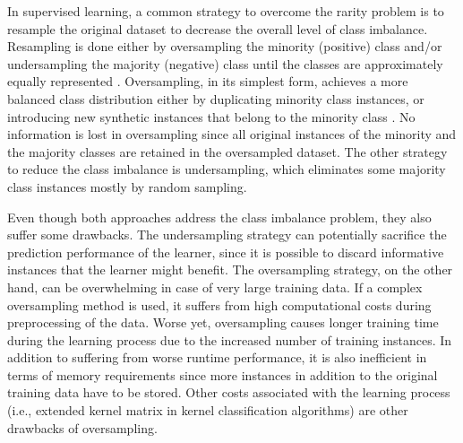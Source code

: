 In supervised learning, a common strategy to overcome the rarity problem is to resample the original dataset to decrease the overall level of class imbalance. Resampling is done either by oversampling the minority (positive) class and/or undersampling the majority (negative) class until the classes are approximately equally represented \cite{Chawla_2002,Japkowicz_2000,Kubat_1997,Ling_1998}. Oversampling, in its simplest form, achieves a more balanced class distribution either by duplicating minority class instances, or introducing new synthetic instances that belong to the minority class \cite{Chawla_2002}. No information is lost in oversampling since all original instances of the minority and the majority classes are retained in the oversampled dataset. The other strategy to reduce the class imbalance is undersampling, which eliminates some majority class instances mostly by random sampling.

Even though both approaches address the class imbalance problem, they also suffer some drawbacks. The undersampling strategy can potentially sacrifice the prediction performance of the learner, since it is possible to discard informative instances that the learner might benefit. The oversampling strategy, on the other hand, can be overwhelming in case of very large training data. If a complex oversampling method is used, it suffers from high computational costs during preprocessing of the data. Worse yet, oversampling causes longer training time during the learning process due to the increased number of training instances. In addition to suffering from worse runtime performance, it is also inefficient in terms of memory requirements since more instances in addition to the original training data have to be stored. Other costs associated with the learning process (i.e., extended kernel matrix in kernel classification algorithms) are other drawbacks of oversampling.

